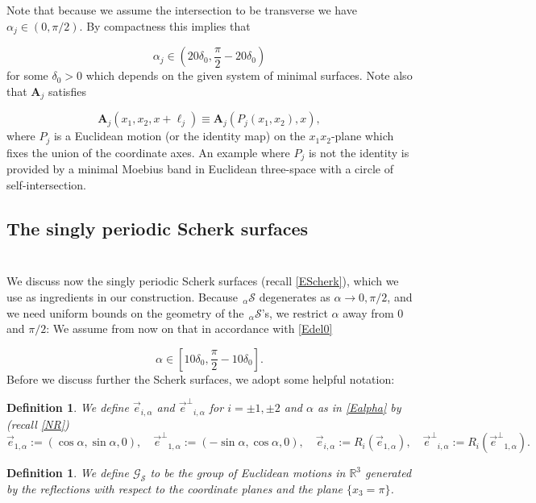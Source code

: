 \documentclass[12pt,namelimits,sumlimits]{amsart}
\newtheorem{definition}[theorem]{Definition}
\theoremstyle{remark}
\numberwithin{equation}{section}
\begin{document}
Note that because we assume the intersection to be transverse we have
$\alpha_j\in(0,\pi/2)$.
By compactness this implies that 
\addtocounter{theorem}{1}
\begin{equation}
\label{Edel0}
\alpha_j\in(20\delta_0,\frac\pi2-20\delta_0)
\end{equation}
for some $\delta_0>0$ which depends on the given system
of minimal surfaces.
Note also that ${\boldsymbol{A}}_j$ satisfies
\addtocounter{theorem}{1}
\begin{equation}
\label{EAlk}
{\boldsymbol{A}}_j(x_1,x_2,x+\ell_j)  \equiv   {\boldsymbol{A}}_j(P_j(x_1,x_2), x),
\end{equation}
where $P_j$ is a Euclidean motion (or the identity map) on the $x_1x_2$-plane
which fixes the union of the coordinate axes.
An example where $P_j$ is not the identity is provided by a minimal Moebius band in Euclidean three-space
with a circle of self-intersection.

\subsection*{The singly periodic Scherk surfaces}
$\phantom{ab}$
\nopagebreak

We discuss now the singly periodic Scherk surfaces (recall \ref{EScherk}),
which we use as ingredients in our construction.
Because ${{{}_{\,\alpha\!}\mathcal{S}}}$ degenerates as $\alpha\to0,\pi/2$,
and we need uniform bounds on the geometry of the ${{{}_{\,\alpha\!}\mathcal{S}}}$'s,
we restrict $\alpha$ away from $0$ and $\pi/2$:
We assume from now on that in accordance with \ref{Edel0}
\addtocounter{theorem}{1}
\begin{equation}
\label{Ealpha}
\alpha\in[10\delta_0,\frac\pi2-10\delta_0].
\end{equation}
Before we discuss further the Scherk surfaces, we adopt some helpful notation:
\addtocounter{equation}{1}
\begin{definition}
\label{Dvece}
We define ${\vec{e}}_{i,\alpha}$ and ${{\vec{e}^\perp}}_{i,\alpha}$ for ${{i=\pm1,\pm2}}$
and $\alpha$ as in \ref{Ealpha} by (recall \ref{NR})
$$
{\vec{e}}_{1,\alpha}:=(\cos\alpha,\sin\alpha,0),
\quad
{{\vec{e}^\perp}}_{1,\alpha}:=(-\sin\alpha,\cos\alpha,0),
\quad
{\vec{e}}_{{i,\alpha}}:=R_i({\vec{e}}_{{1,\alpha}}),
\quad
{{\vec{e}^\perp}}_{{i,\alpha}}:=R_i({{\vec{e}^\perp}}_{{1,\alpha}}).
$$
\end{definition}

\addtocounter{equation}{1}
\begin{definition}
\label{DgroupS}
We define ${{\mathscr{G}_{{\mathcal{S}}}}}$ to be the group of Euclidean motions in ${\mathbb{R}}^3$
generated by the reflections with respect to the coordinate planes and the plane
$\{x_3=\pi\}$.
\end{definition}
\end{document}
